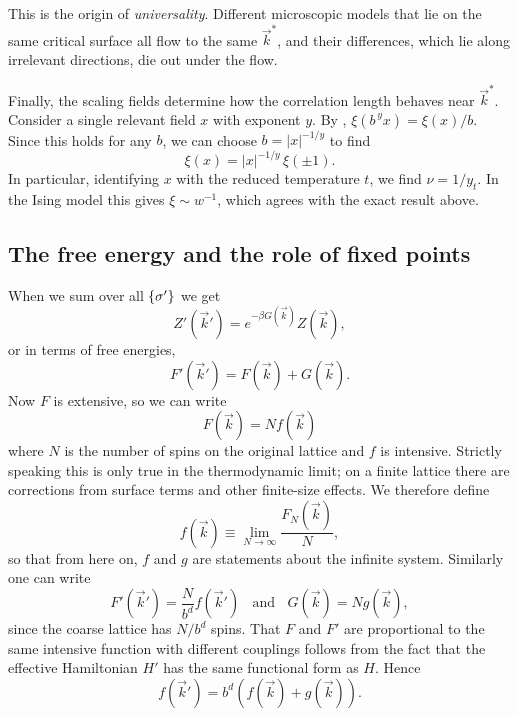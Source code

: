 This is the origin of {\it universality}. Different
microscopic models that lie on the same critical surface all flow to the same
$\vec{k}^*$, and their differences, which lie along irrelevant directions, die out
under the flow.

Finally, the scaling fields determine how the correlation length behaves near
$\vec{k}^*$. Consider a single relevant field $x$ with exponent $y$. By
, $\xi(b^{\,y}x)=\xi(x)/b$. Since this holds for any $b$, we
can choose $b=|x|^{-1/y}$ to find
\begin{equation}
  \xi(x)=|x|^{-1/y}\,\xi(\pm1).
\end{equation}
In particular, identifying $x$ with the reduced temperature $t$, we find
$\nu=1/y_t$. In the  Ising model this gives $\xi\sim w^{-1}$, which agrees
with the exact result above.

\subsection{The free energy and the role of fixed points}\label{sec:RGfreeEnergy}

When we sum  over all $\left\{\sigma'\right\}$ we get
\begin{equation}
  Z'(\vec{k}')=e^{-\beta G(\vec{k})} Z(\vec{k}),
\end{equation}
or in terms of free energies,
\begin{equation}
  F'(\vec{k}')=F(\vec{k})+G(\vec{k}).
\end{equation}
Now $F$ is extensive, so we can write
\begin{equation}
  F(\vec{k})=Nf(\vec{k})
\end{equation}
where $N$ is the number of spins on the original lattice and $f$ is intensive.
Strictly speaking this is only true in the thermodynamic limit; on a finite
lattice there are corrections from surface terms and other finite-size effects.
We therefore define
\begin{equation}
  f(\vec{k})\equiv\lim_{N\to\infty}\frac{F_N(\vec{k})}{N},
\end{equation}
so that from here on, $f$ and $g$ are statements about the infinite system.
Similarly one can write
\begin{equation}
  F'(\vec{k}')=\frac{N}{b^d}f(\vec{k}')~~~~\text{and}~~~~G(\vec{k})=Ng(\vec{k}),
\end{equation}
since the coarse lattice has $N/b^d$ spins. That $F$ and $F'$ are proportional
to the same intensive function with different couplings follows from the fact
that the effective Hamiltonian $H'$ has the same functional form as $H$.
Hence
\begin{equation}\label{eq:widom1}
f(\vec{k}')=b^d\left(f(\vec{k})+g(\vec{k})\right).
\end{equation}

